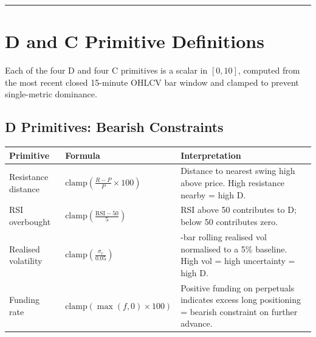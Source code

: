 \documentclass[12pt]{article}
\begin{document}
\begin{center}\rule{0.5\linewidth}{0.5pt}\end{center}

\section{D and C Primitive Definitions}\label{d-and-c-primitive-definitions}

Each of the four D and four C primitives is a scalar in \([0, 10]\),
computed from the most recent closed 15-minute OHLCV bar window and
clamped to prevent single-metric dominance.

\subsection{D Primitives: Bearish Constraints}\label{d-primitives-bearish-constraints}

\begin{longtable}[]{@{}
  >{\raggedright\arraybackslash}p{}
  >{\raggedright\arraybackslash}p{}
  >{\raggedright\arraybackslash}p{}@{}}
\toprule\noalign{}
\begin{minipage}[b]{\linewidth}\raggedright
Primitive
\end{minipage} & \begin{minipage}[b]{\linewidth}\raggedright
Formula
\end{minipage} & \begin{minipage}[b]{\linewidth}\raggedright
Interpretation
\end{minipage} \\
\midrule\noalign{}
\endhead
\bottomrule\noalign{}
\endlastfoot
Resistance distance &
\(\text{clamp}\!\left(\frac{R - P}{P} \times 100\right)\) & Distance to
nearest swing high above price. High resistance nearby = high D. \\
RSI overbought &
\(\text{clamp}\!\left(\frac{\text{RSI} - 50}{5}\right)\) & RSI above 50
contributes to D; below 50 contributes zero. \\
Realised volatility &
\(\text{clamp}\!\left(\frac{\sigma_r}{0.05}\right)\) & 30-bar rolling
realised vol normalised to a 5\% baseline. High vol = high uncertainty =
high D. \\
Funding rate & \(\text{clamp}\!\left(\max(f, 0) \times 100\right)\) &
Positive funding on perpetuals indicates excess long positioning =
bearish constraint on further advance. \\
\end{longtable}
\end{document}
